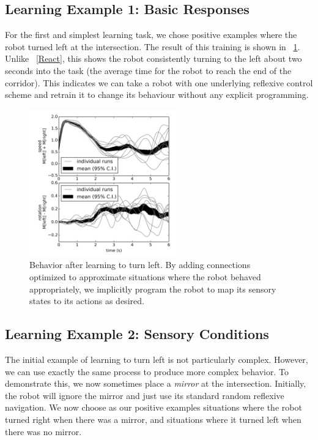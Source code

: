 \documentclass{frontiersSCNS}
\begin{document}
\subsection{Learning Example 1: Basic Responses}

For the first and simplest learning task, we chose positive examples
where the robot turned left at the intersection.
The result of this training is shown in \figurename~\ref{Left}. Unlike 
\figurename~\ref{React}, this shows the robot consistently turning to the left about 
two seconds into the task (the average time for the robot to reach the end of the corridor).
This indicates we can take a robot with one underlying reflexive control scheme
and retrain it to change its behaviour without any explicit programming.

\begin{figure}[!t]
\centering
\includegraphics[width=2.5in]{../figures/learn-left/learnleft.png}
\caption{Behavior after learning to turn left. By adding connections optimized to approximate situations where the robot behaved appropriately, we implicitly program the robot to map its sensory states to its actions as desired.}
\label{Left}
\end{figure}

\subsection{Learning Example 2: Sensory Conditions} \label{learningConditions}

The initial example of learning to turn left is not particularly complex. 
However, we can use exactly the same process to produce more complex behavior.
To demonstrate this, we now sometimes place a \textit{mirror} at the intersection.
Initially, the robot will ignore the mirror and just use its standard random
reflexive navigation.  We now choose as our positive examples situations where
the robot turned right when there was a mirror, and situations where it turned
left when there was no mirror.
\end{document}
